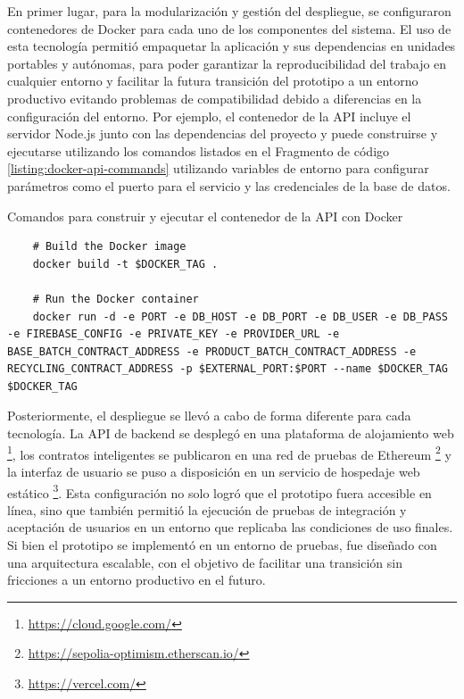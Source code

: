 En primer lugar, para la modularización y gestión del despliegue, se configuraron contenedores de Docker para cada uno de los componentes del sistema. El uso de esta tecnología permitió empaquetar la aplicación y sus dependencias en unidades portables y autónomas, para poder garantizar la reproducibilidad del trabajo en cualquier entorno y facilitar la futura transición del prototipo a un entorno productivo evitando problemas de compatibilidad debido a diferencias en la configuración del entorno. Por ejemplo, el contenedor de la API incluye el servidor Node.js junto con las dependencias del proyecto y puede construirse y ejecutarse utilizando los comandos listados en el Fragmento de código \ref{listing:docker-api-commands} utilizando variables de entorno para configurar parámetros como el puerto para el servicio y las credenciales de la base de datos.

\begin{listing}[!htb]
\caption{Comandos para construir y ejecutar el contenedor de la API con Docker}
\label{listing:docker-api-commands}
\begin{verbatim}
	# Build the Docker image
	docker build -t $DOCKER_TAG .

	# Run the Docker container
	docker run -d -e PORT -e DB_HOST -e DB_PORT -e DB_USER -e DB_PASS -e FIREBASE_CONFIG -e PRIVATE_KEY -e PROVIDER_URL -e BASE_BATCH_CONTRACT_ADDRESS -e PRODUCT_BATCH_CONTRACT_ADDRESS -e RECYCLING_CONTRACT_ADDRESS -p $EXTERNAL_PORT:$PORT --name $DOCKER_TAG $DOCKER_TAG
\end{verbatim}
\end{listing}


Posteriormente, el despliegue se llevó a cabo de forma diferente para cada tecnología. La API de backend se desplegó en una plataforma de alojamiento web \footnote{\url{https://cloud.google.com/}}, los contratos inteligentes se publicaron en una red de pruebas de Ethereum \footnote{\url{https://sepolia-optimism.etherscan.io/}} y la interfaz de usuario se puso a disposición en un servicio de hospedaje web estático \footnote{\url{https://vercel.com/}}. Esta configuración no solo logró que el prototipo fuera accesible en línea, sino que también permitió la ejecución de pruebas de integración y aceptación de usuarios en un entorno que replicaba las condiciones de uso finales. Si bien el prototipo se implementó en un entorno de pruebas, fue diseñado con una arquitectura escalable, con el objetivo de facilitar una transición sin fricciones a un entorno productivo en el futuro.

